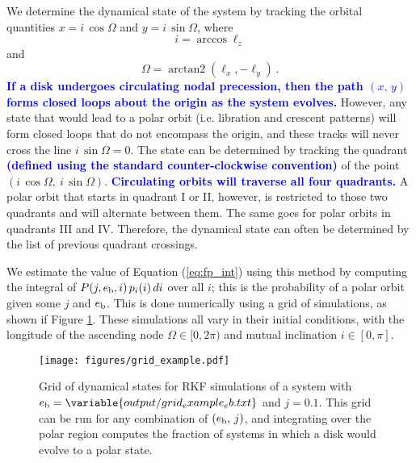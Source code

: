 \documentclass[twocolumn,linenumbers]{aastex631}
\newcommand{\RR}[1]{\textcolor{blue}{\bf#1}} %
\newcommand{\RP}[1]{\RR{#1}} %
\DeclareMathOperator{\arctantwo}{arctan2}
\begin{document}
We determine the dynamical state of the system by tracking the orbital quantities $x=i\,\cos{\Omega}$ and $y=i\,\sin{\Omega}$, where
\begin{equation}
    i = \arccos{\ell_z}
    \label{eq:inclination}
\end{equation}
and
\begin{equation}
    \Omega = \arctantwo (\ell_x, -\ell_y)\, .
    \label{eq:omega}
\end{equation}
\RR{If a disk undergoes circulating nodal precession, then the path $(x,\,y)$ forms closed loops about the origin as the system evolves. }
However, any state that would lead to a polar orbit (i.e. libration and crescent patterns) will form closed loops that do not encompass the origin, and these tracks will never cross the line $i\,\sin{\Omega}=0$. The state can be determined by tracking the quadrant \RR{(defined using the standard counter-clockwise convention)} of the point $(i\,\cos{\Omega},~i\,\sin{\Omega})$. \RP{Circulating orbits will traverse all four quadrants.}
A polar orbit that starts in quadrant I or II, however, is restricted to those two quadrants and will alternate between them. The same goes for polar orbits in quadrants III and IV. Therefore, the dynamical state can often be determined by the list of previous quadrant crossings.

We estimate the value of Equation (\ref{eq:fp_int}) using this method by computing the integral of $P(j,e_{\rm b},i)\,p_i(i)\,di$ over all $i$; this is the probability of a polar orbit given some $j$ and $e_{\rm b}$. This is done numerically using a grid of simulations, as shown if Figure \ref{fig:grid_example}. These simulations all vary in their initial conditions, with the longitude of the ascending node $\Omega \in [0,2\pi)$ and mutual inclination $i \in [0,\pi]$.

\begin{figure}
    \begin{centering}
        \texttt{[image: figures/grid\_example.pdf]}
    \end{centering}
    \caption{
        Grid of dynamical states for  RKF simulations of a system with $e_{\rm b}=\variable{output/grid_example_eb.txt}$ and $j=0.1$. This grid can be run for any combination of $(e_{\rm b},\,j)$, and integrating over the polar region computes the fraction of systems in which a disk would evolve to a polar state.
    }
    \label{fig:grid_example}
\end{figure}
\end{document}
